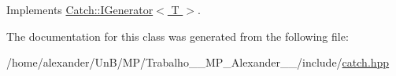 Implements \hyperlink{structCatch_1_1IGenerator_a2e317253b03e838b6065ce69719a198e}{Catch\-::\-I\-Generator$<$ T $>$}.



The documentation for this class was generated from the following file\-:\begin{DoxyCompactItemize}
\item 
/home/alexander/\-Un\-B/\-M\-P/\-Trabalho\-\_\-\_\-\-M\-P\-\_\-\-Alexander\-\_\-\_/include/\hyperlink{catch_8hpp}{catch.\-hpp}\end{DoxyCompactItemize}
